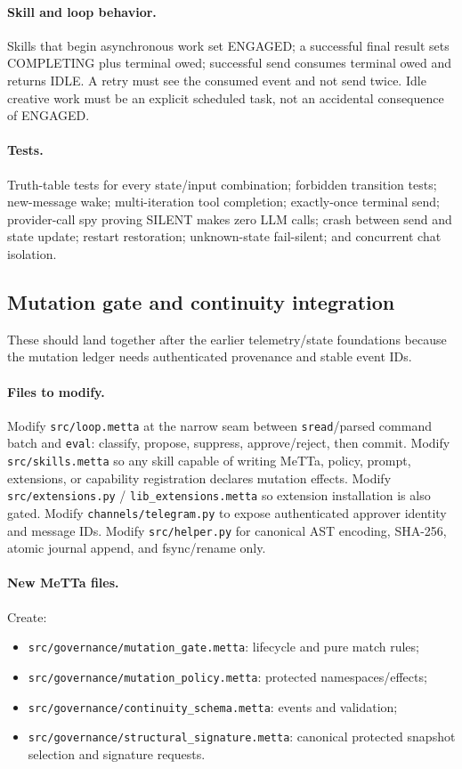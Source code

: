 \documentclass[11pt]{article}
\begin{document}
\paragraph{Skill and loop behavior.}
Skills that begin asynchronous work set ENGAGED; a successful final result sets
COMPLETING plus terminal owed; successful send consumes terminal owed and returns
IDLE.  A retry must see the consumed event and not send twice.  Idle creative work
must be an explicit scheduled task, not an accidental consequence of ENGAGED.

\paragraph{Tests.}
Truth-table tests for every state/input combination; forbidden transition tests;
new-message wake; multi-iteration tool completion; exactly-once terminal send;
provider-call spy proving SILENT makes zero LLM calls; crash between send and
state update; restart restoration; unknown-state fail-silent; and concurrent chat
isolation.

\subsection{Mutation gate and continuity integration}

These should land together after the earlier telemetry/state foundations because
the mutation ledger needs authenticated provenance and stable event IDs.

\paragraph{Files to modify.}
Modify \texttt{src/loop.metta} at the narrow seam between \texttt{sread}/parsed
command batch and \texttt{eval}: classify, propose, suppress, approve/reject, then
commit.  Modify \texttt{src/skills.metta} so any skill capable of writing MeTTa,
policy, prompt, extensions, or capability registration declares mutation effects.
Modify \texttt{src/extensions.py} / \texttt{lib\_extensions.metta} so extension
installation is also gated.  Modify \texttt{channels/telegram.py} to expose
authenticated approver identity and message IDs.  Modify \texttt{src/helper.py}
for canonical AST encoding, SHA-256, atomic journal append, and fsync/rename only.

\paragraph{New MeTTa files.}
Create:
\begin{itemize}
\item \texttt{src/governance/mutation\_gate.metta}: lifecycle and pure match rules;
\item \texttt{src/governance/mutation\_policy.metta}: protected namespaces/effects;
\item \texttt{src/governance/continuity\_schema.metta}: events and validation;
\item \texttt{src/governance/structural\_signature.metta}: canonical protected
snapshot selection and signature requests.
\end{itemize}
\end{document}
